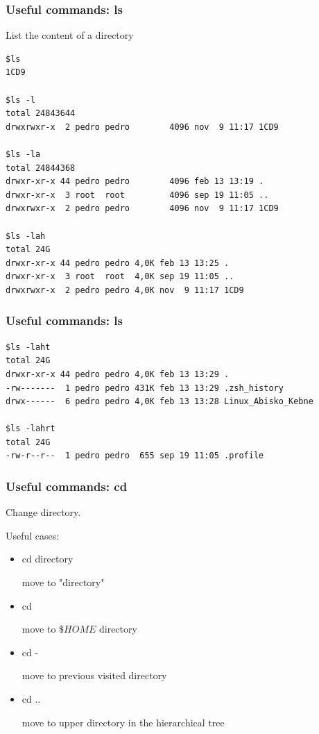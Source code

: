 \begin{frame}[fragile]
	\frametitle{Useful commands: ls}
List the content of a directory
{\scriptsize
	\begin{verbatim}
$ls
1CD9

$ls -l
total 24843644
drwxrwxr-x  2 pedro pedro        4096 nov  9 11:17 1CD9

$ls -la
total 24844368
drwxr-xr-x 44 pedro pedro        4096 feb 13 13:19 .
drwxr-xr-x  3 root  root         4096 sep 19 11:05 ..
drwxrwxr-x  2 pedro pedro        4096 nov  9 11:17 1CD9

$ls -lah
total 24G
drwxr-xr-x 44 pedro pedro 4,0K feb 13 13:25 .
drwxr-xr-x  3 root  root  4,0K sep 19 11:05 ..
drwxrwxr-x  2 pedro pedro 4,0K nov  9 11:17 1CD9
	\end{verbatim}
}

\end{frame}
\begin{frame}[fragile]
	\frametitle{Useful commands: ls}
{\scriptsize
	\begin{verbatim}
$ls -laht
total 24G
drwxr-xr-x 44 pedro pedro 4,0K feb 13 13:29 .
-rw-------  1 pedro pedro 431K feb 13 13:29 .zsh_history
drwx------  6 pedro pedro 4,0K feb 13 13:28 Linux_Abisko_Kebne

$ls -lahrt
total 24G
-rw-r--r--  1 pedro pedro  655 sep 19 11:05 .profile
	\end{verbatim}
}

\end{frame}

\begin{frame}[fragile]
	\frametitle{Useful commands: cd}
Change directory.

Useful cases:
	\begin{itemize}
        \item cd directory 

        move to "directory" 
        \item cd
 
         move to $\$HOME$ directory
        \item cd - 

        move to previous visited directory

        \item cd ..

        move to upper directory in the hierarchical tree
 
	\end{itemize}
        
\end{frame}

